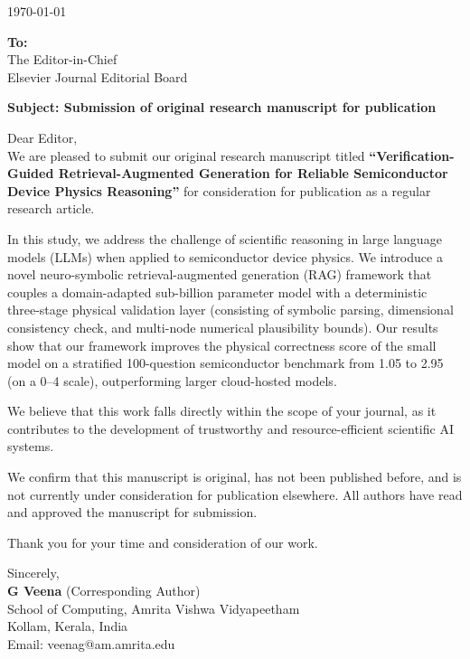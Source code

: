 \documentclass[12pt]{article}
\begin{document}
\pagestyle{empty}

\hfill \today

\noindent
\textbf{To:} \\
The Editor-in-Chief \\
Elsevier Journal Editorial Board \\

\vspace{1.5em}

\noindent
\textbf{Subject: Submission of original research manuscript for publication}

\vspace{1.5em}

\noindent
Dear Editor, \\

\vspace{1em}
\noindent
We are pleased to submit our original research manuscript titled \textbf{``Verification-Guided Retrieval-Augmented Generation for Reliable Semiconductor Device Physics Reasoning''} for consideration for publication as a regular research article.

\vspace{1em}
\noindent
In this study, we address the challenge of scientific reasoning in large language models (LLMs) when applied to semiconductor device physics. We introduce a novel neuro-symbolic retrieval-augmented generation (RAG) framework that couples a domain-adapted sub-billion parameter model with a deterministic three-stage physical validation layer (consisting of symbolic parsing, dimensional consistency check, and multi-node numerical plausibility bounds). Our results show that our framework improves the physical correctness score of the small model on a stratified 100-question semiconductor benchmark from 1.05 to 2.95 (on a 0--4 scale), outperforming larger cloud-hosted models.

\vspace{1em}
\noindent
We believe that this work falls directly within the scope of your journal, as it contributes to the development of trustworthy and resource-efficient scientific AI systems.

\vspace{1em}
\noindent
We confirm that this manuscript is original, has not been published before, and is not currently under consideration for publication elsewhere. All authors have read and approved the manuscript for submission.

\vspace{1.5em}
\noindent
Thank you for your time and consideration of our work.

\vspace{1.5em}
\noindent
Sincerely, \\
\textbf{G Veena} (Corresponding Author) \\
School of Computing, Amrita Vishwa Vidyapeetham \\
Kollam, Kerala, India \\
Email: veenag@am.amrita.edu \\
\end{document}
